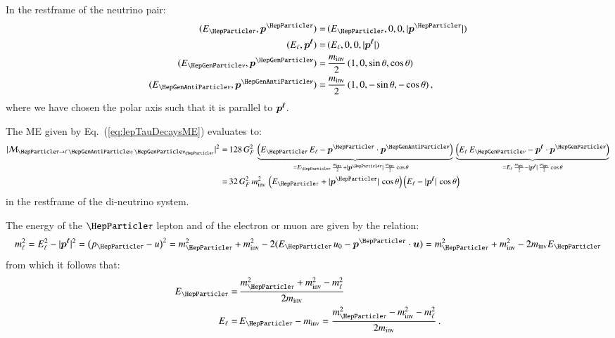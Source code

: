 In the restframe of the neutrino pair:
\begin{align}
( E_{\Pgt}, \bm{p^{\Pgt}} ) = & \, ( E_{\Pgt}, 0, 0, \vert\bm{p^{\Pgt}}\vert ) \nonumber \\
( E_{\Plepton}, \bm{p^{\Plepton}} ) = & \, ( E_{\Plepton}, 0, 0, \vert\bm{p^{\Plepton}}\vert ) \nonumber \\
( E_{\Pnu}, \bm{p^{\Pnu}} ) = & \, \frac{m_{\inv}}{2} \, ( 1, 0, \sin\theta, \cos\theta ) \nonumber \\
( E_{\APnu}, \bm{p^{\APnu}} ) = & \, \frac{m_{\inv}}{2} \, ( 1, 0, -\sin\theta, -\cos\theta ) \, , \nonumber 
\end{align}
where we have chosen the polar axis such that it is parallel to $\bm{p^{\ell}}$.

The ME given by Eq.~(\ref{eq:lepTauDecaysME}) evaluates to:
\begin{align}
\vert\mathcal{M}_{\Pgt \to \ellnunu}\vert^{2} 
 = & \, 128 \, G^{2}_{F} \, 
  \underbrace{\left( E_{\Pgt} \, E_{\Plepton} - \bm{p^{\Pgt}} \cdot \bm{p^{\APnu}} \right)}_{= E_{\Pgt} \, \frac{m_{\inv}}{2} + \vert\bm{p^{\Pgt}}\vert \, \frac{m_{\inv}}{2} \cos\theta \quad} \,
  \underbrace{\left( E_{\Plepton} \, E_{\Pnu} - \bm{p^{\Plepton}} \cdot \bm{p^{\Pnu}} \right)}_{= E_{\Plepton} \, \frac{m_{\inv}}{2} - \vert\bm{p^{\Plepton}}\vert \, \frac{m_{\inv}}{2} \cos\theta} \nonumber \\
 = & \, 32 \, G^{2}_{F} \, m^{2}_{\inv} \, \left( E_{\Pgt} + \vert\bm{p^{\Pgt}}\vert \, \cos\theta \right)  \left( E_{\Plepton} - \vert\bm{p^{\Plepton}}\vert \, \cos\theta \right) 
\label{eq:lepTauDecaysMErf}
\end{align}
in the restframe of the di-neutrino system.

The energy of the $\Pgt$ lepton and of the electron or muon are given
by the relation:
\begin{equation}
m^{2}_{\Plepton} = E_{\Plepton}^{2} - \vert\bm{p^{\Plepton}}\vert^{2} = \left( p_{\Pgt} - u \right)^{2} 
  = m^{2}_{\Pgt} + m^{2}_{\inv} - 2 (E_{\Pgt} \, u_{0} - \bm{p^{\Pgt}} \cdot \bm{u}) 
  = m^{2}_{\Pgt} + m^{2}_{\inv} - 2 m_{\inv} E_{\Pgt}
\end{equation}
from which it follows that:
\begin{align}
E_{\Pgt} = & \, \frac{m^{2}_{\Pgt} + m^{2}_{\inv} - m^{2}_{\Plepton}}{2 m_{\inv}} \nonumber \\
E_{\Plepton} = & \, E_{\Pgt} - m_{\inv} = \frac{m^{2}_{\Pgt} -
  m^{2}_{\inv} - m^{2}_{\Plepton}}{2 m_{\inv}} \, .
\label{eq:lepTauDecaysEn}
\end{align}

